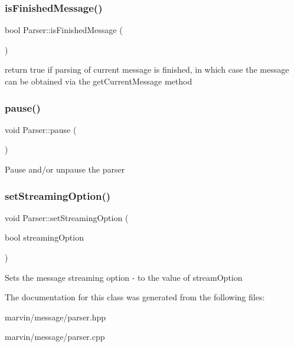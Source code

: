 \subsubsection{\texorpdfstring{is\+Finished\+Message()}{isFinishedMessage()}}
{\footnotesize\ttfamily bool Parser\+::is\+Finished\+Message (\begin{DoxyParamCaption}{ }\end{DoxyParamCaption})}

return true if parsing of current message is finished, in which case the message can be obtained via the get\+Current\+Message method \mbox{\label{class_parser_a534e9326567306cdf50a7bb980292c37}} 
\subsubsection{\texorpdfstring{pause()}{pause()}}
{\footnotesize\ttfamily void Parser\+::pause (\begin{DoxyParamCaption}{ }\end{DoxyParamCaption})}

Pause and/or unpause the parser \mbox{\label{class_parser_ac6eba4f77cd89023b2940e46ed449df3}} 
\subsubsection{\texorpdfstring{set\+Streaming\+Option()}{setStreamingOption()}}
{\footnotesize\ttfamily void Parser\+::set\+Streaming\+Option (\begin{DoxyParamCaption}\item[{bool}]{streaming\+Option }\end{DoxyParamCaption})}

Sets the message streaming option -\/ to the value of stream\+Option 

The documentation for this class was generated from the following files\+:\begin{DoxyCompactItemize}
\item 
marvin/message/parser.\+hpp\item 
marvin/message/parser.\+cpp\end{DoxyCompactItemize}
